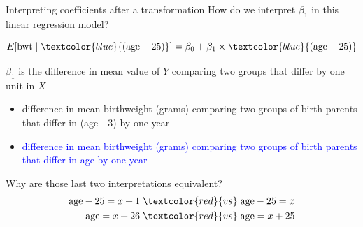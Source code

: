 \documentclass[10pt,t]{beamer}
\begin{document}
\begin{frame}{Interpreting coefficients after a transformation}
How do we interpret $\beta_1$ in this linear regression model?

$$
E[\text{bwt} \mid \textcolor{blue}{(\text{age} - 25)}] = \beta_0 + \beta_1 \times \textcolor{blue}{(\text{age} - 25)}
$$

\vspace{0.2cm}

$\beta_1$ is the difference in mean value of $Y$ comparing two groups that differ by one unit in $X$

\begin{itemize}
	\item[] difference in mean birthweight (grams) comparing two groups of birth parents that differ in (age - 3) by one year
	\item[] \textcolor{blue}{difference in mean birthweight (grams) comparing two groups of birth parents that differ in age by one year}
\end{itemize} 

\vspace{0.3cm}

Why are those last two interpretations equivalent?
\begin{align*}
\text{age} - 25 = x + 1 \hspace{0.1cm}& \textcolor{red}{vs}  \hspace{0.1cm}\text{age} - 25 = x \\
\text{age} = x + 26 \hspace{0.1cm}& \textcolor{red}{vs}  \hspace{0.1cm}\text{age}  = x + 25
\end{align*}

\end{frame}
\end{document}
